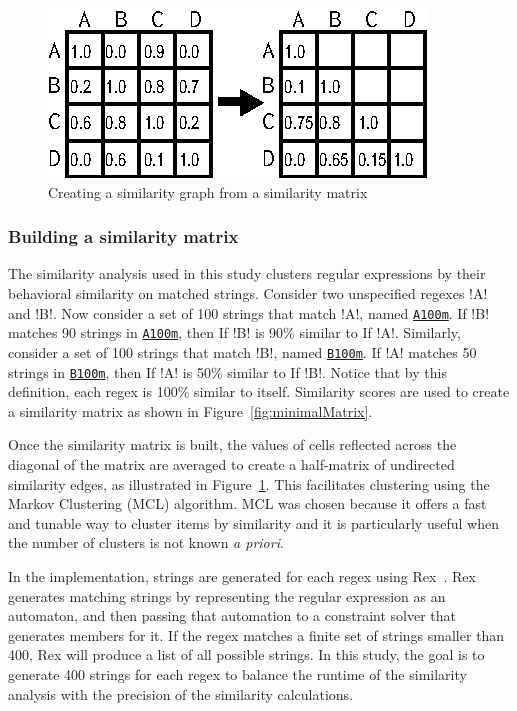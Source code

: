 \begin{figure}[tb]
\centering
\includegraphics[width=0.5\columnwidth]{nontex/illustrations/matrixToGraph.eps}
\vspace{-6pt}
\caption{Creating a similarity graph from a similarity matrix}
\vspace{-6pt}
\label{fig:matrixToGraph}
\end{figure}



\subsubsection{Building a similarity matrix}
The similarity analysis used in this study clusters regular expressions by their behavioral similarity on matched strings.  Consider two unspecified regexes \cverb!A! and \cverb!B!.
Now consider a set of 100 strings that match \cverb!A!, named \underline{\tt A100m}.  If \cverb!B! matches 90 strings in \underline{\tt A100m}, then If \cverb!B! is 90\% similar to If \cverb!A!.  Similarly, consider a set of 100 strings that match \cverb!B!, named \underline{\tt B100m}.  If \cverb!A! matches 50 strings in \underline{\tt B100m}, then If \cverb!A! is 50\% similar to If \cverb!B!.  Notice that by this definition, each regex is 100\% similar to itself.  Similarity scores are used to create a similarity matrix as shown in Figure~\ref{fig:minimalMatrix}.

Once the similarity matrix is built, the values of cells reflected across the diagonal of the matrix are averaged to create a half-matrix of undirected similarity edges, as illustrated in Figure~\ref{fig:matrixToGraph}.
This facilitates clustering using the  Markov Clustering (MCL) algorithm.
MCL was chosen because it offers a fast and tunable way to cluster items by similarity and it is particularly useful when the number of clusters is not known \emph{a priori}.


In the implementation, strings are generated for each regex using Rex~\cite{rex}.  Rex generates matching strings by representing the regular expression as an automaton, and then passing that automation to a constraint solver that generates members for it.  If the regex matches a finite set of strings smaller than 400, Rex will produce a list of all possible strings.
In this study, the goal is to generate 400 strings for each regex to balance the runtime of the similarity analysis with the precision of the similarity calculations.

